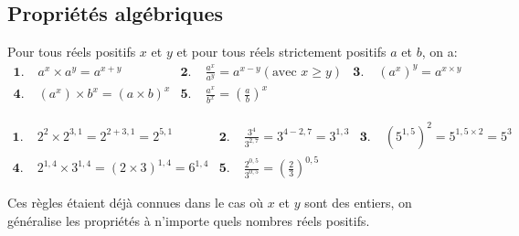 \documentclass[11pt]{article}
\begin{document}
\subsection{Propriétés algébriques}
\begin{prop}
  Pour tous réels positifs $x$ et $y$ et pour tous réels strictement positifs
  $a$ et $b$, on a:
  \begin{align*}
    \textbf{1.}&\; a^x\times a^y = a^{x+y} &
    \textbf{2.}&\; \frac{a^x}{a^y}=a^{x-y} (\text{avec }x\geq y) &
    \textbf{3.}&\; (a^x)^y=a^{x\times y} \\
    \textbf{4.}&\; (a^x)\times b^x=(a\times b)^x &
    \textbf{5.}&\; \frac{a^x}{b^x}=\left(\frac{a}{b}\right)^x &
    &
  \end{align*}
\end{prop}
\begin{exemple}
  \begin{align*}
    \textbf{1.}\;& 2^2\times2^{3,1}=2^{2+3,1}=2^{5,1} &
    \textbf{2.}\;& \frac{3^{4}}{3^{2,7}}=3^{4-2,7} = 3^{1,3} &
    \textbf{3.}\;& \left( 5^{1,5} \right)^2=5^{1,5\times2}=5^3 \\
    \textbf{4.}\;& 2^{1,4}\times3^{1,4} = \left( 2\times3 \right)^{1,4} =
    6^{1,4} &
    \textbf{5.}\;& \frac{2^{0,5}}{3^{0,5}}=\left( \frac{2}{3} \right)^{0,5} &
    &
  \end{align*}
\end{exemple}
\begin{rmq}
  Ces règles étaient déjà connues dans le cas où $x$ et $y$ sont des entiers, on
  généralise les propriétés à n'importe quels nombres réels positifs.
\end{rmq}
\end{document}
